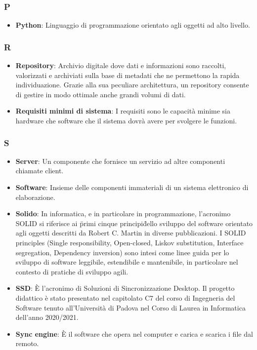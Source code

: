 \subsubsection{P}
\begin{itemize}
	\item \textbf{Python}: Linguaggio di programmazione orientato agli oggetti ad alto livello.
\end{itemize}

\subsubsection{R}
\begin{itemize}
	\item \textbf{Repository}: Archivio digitale dove dati e informazioni sono raccolti, valorizzati e archiviati sulla base di metadati che ne permettono la rapida individuazione. Grazie alla sua peculiare architettura, un repository consente di gestire in modo ottimale anche grandi volumi di dati.
	\item \textbf{Requisiti minimi di sistema}: I requisiti sono le capacità minime sia hardware che software che il sistema dovrà avere per svolgere le funzioni.
\end{itemize}

\subsubsection{S}
\begin{itemize}
	\item \textbf{Server}: Un componente che fornisce un servizio ad altre componenti chiamate client.
	\item \textbf{Software}: Insieme delle componenti immateriali di un sistema elettronico di elaborazione.
	\item \textbf{Solido}: In informatica, e in particolare in programmazione, l'acronimo SOLID si riferisce ai \"primi cinque principi\" dello sviluppo del software orientato agli oggetti descritti da Robert C. Martin in diverse pubblicazioni. I SOLID principles (Single responsibility, Open-closed, Liskov substitution, Interface segregation, Dependency inversion) sono intesi come linee guida per lo sviluppo di software leggibile, estendibile e mantenibile, in particolare nel contesto di pratiche di sviluppo agili.
	\item \textbf{SSD}: È l'acronimo di Soluzioni di Sincronizzazione Desktop. Il progetto didattico è stato presentato nel capitolato C7 del corso di Ingegneria del Software tenuto all'Università di Padova nel Corso di Laurea in Informatica dell'anno 2020/2021.
	\item \textbf{Sync engine}: È il software che opera nel computer e carica e scarica i file dal remoto.
\end{itemize}

